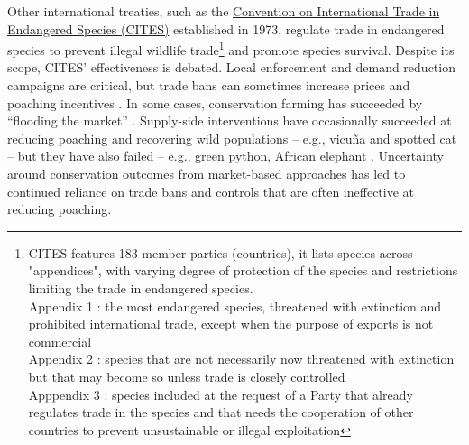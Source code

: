 Other international treaties, such as the \href{https://cites.org/fra}{Convention on International Trade in Endangered Species (CITES)} established in 1973, regulate trade in endangered species to prevent illegal wildlife trade\footnote{CITES features 183 member parties (countries), it lists species across "appendices", with varying degree of protection of the species and restrictions limiting the trade in endangered species.\\
Appendix 1 : the most endangered species, threatened with extinction and prohibited international trade, except when the purpose of exports is not commercial\\
Appendix 2 : species that are not necessarily now threatened with extinction but that may become so unless trade is closely controlled\\
Apppendix 3 : species included at the request of a Party that already regulates trade in the species and that needs the cooperation of other countries to prevent unsustainable or illegal exploitation} and promote species survival. Despite its scope, CITES’ effectiveness is debated. Local enforcement \citep{HEID2023102784} and demand reduction campaigns \citep{macfarlane_reducing_2022, moorhouse_demand_2024} are critical, but trade bans can sometimes increase prices and poaching incentives \citep{hsiang_does_2016}. In some cases, conservation farming has succeeded by “flooding the market” \citep{gentry_looking_2019, phelps_framework_2014, tensen_under_2016}. Supply-side interventions have occasionally succeeded at reducing poaching and recovering wild populations – e.g., vicuña and spotted cat \citep{iucn_world_2000, sahley_biological_2007} – but they have also failed – e.g., green python, African elephant \citep{lyons_wildlife_2011, hsiang_does_2016}. Uncertainty around conservation outcomes from market-based approaches has led to continued reliance on trade bans and controls that are often ineffective at reducing poaching.

